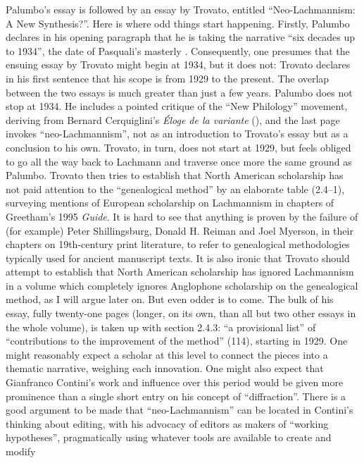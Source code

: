\documentclass{article}
\begin{document}
Palumbo's essay is followed by an essay by Trovato, entitled
``Neo-Lachmannism: A New Synthesis?''. Here is where odd things start
happening. Firstly, Palumbo declares in his opening paragraph that he is
taking the narrative ``six decades up to 1934'', the date of Pasquali's
masterly .
Consequently, one presumes that the ensuing essay by Trovato might begin
at 1934, but it does not: Trovato declares in his first sentence that
his scope is from 1929 to the present. The overlap between the two
essays is much greater than just a few years. Palumbo does not stop at
1934. He includes a pointed critique of the ``New Philology'' movement,
deriving from Bernard Cerquiglini's \emph{Éloge de la variante} (\citeyear{cerquiglini_eloge_1989}),
and the last page invokes ``neo-Lachmannism'', not as an introduction to
Trovato's essay but as a conclusion to his own. Trovato, in turn, does
not start at 1929, but feels obliged to go all the way back to Lachmann
and traverse once more the same ground as Palumbo. Trovato then tries to
establish that North American scholarship has not paid attention to the
``genealogical method'' by an elaborate table (2.4--1), surveying
mentions of European scholarship on Lachmannism in chapters of
Greetham's 1995 \emph{Guide}. It is hard to see that anything is proven
by the failure of (for example) Peter Shillingsburg, Donald H. Reiman
and Joel Myerson, in their chapters on 19th-century print literature, to
refer to genealogical methodologies typically used for ancient
manuscript texts. It is also ironic that Trovato should attempt to
establish that North American scholarship has ignored Lachmannism in a
volume which completely ignores Anglophone scholarship on the
genealogical method, as I will argue later on. But even odder is to
come. The bulk of his essay, fully twenty-one pages (longer, on its own,
than all but two other essays in the whole volume), is taken up with
section 2.4.3: ``a provisional list'' of ``contributions to the
improvement of the method'' (114), starting in 1929. One might
reasonably expect a scholar at this level to connect the pieces into a
thematic narrative, weighing each innovation. One might also expect that
Gianfranco Contini's work and influence over this period would be given
more prominence than a single short entry on his concept of
``diffraction''. There is a good argument to be made that
``neo-Lachmannism'' can be located in Contini's thinking about editing,
with his advocacy of editors as makers of ``working hypotheses'',
pragmatically using whatever tools are available to create and modify
\end{document}

